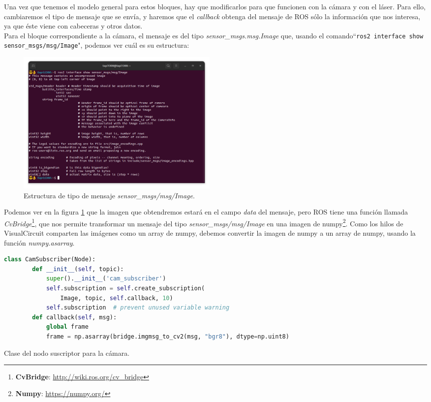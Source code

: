 Una vez que tenemos el modelo general para estos bloques, hay que modificarlos para que funcionen con la cámara y con el láser. Para ello,
cambiaremos el tipo de mensaje que se envía, y haremos que el \textit{callback} obtenga del mensaje de ROS sólo la información que nos interesa,
ya que éste viene con cabeceras y otros datos.\\

Para el bloque correspondiente a la cámara, el mensaje es del tipo \textit{sensor\_msgs.msg.Image} que, usando el comando``\lstinline|ros2 interface show sensor_msgs/msg/Image|",
podemos ver cuál es su estructura:
\begin{figure} [H]
  \begin{center}
      \includegraphics[width=10cm]{figs/c4/image_struct.png}
  \end{center}
  \caption[Estructura mensaje Image]{Estructura de tipo de mensaje \textit{sensor\_msgs/msg/Image}.}
  \label{fig:image_struct}
\end{figure}
Podemos ver en la figura \ref{fig:image_struct} que la imagen que obtendremos estará en el campo \textit{data} del mensaje, pero ROS tiene una
función llamada \textit{CvBridge}\footnote{\textbf{CvBridge}: \url{http://wiki.ros.org/cv_bridge}}, que nos permite transformar un mensaje del
tipo \textit{sensor\_msgs/msg/Image} en una imagen de numpy\footnote{\textbf{Numpy}: \url{https://numpy.org/}}. Como los hilos de VisualCircuit
comparten las imágenes como un array de numpy, debemos convertir la imagen de numpy a un array de numpy, usando la función \textit{numpy.asarray}.
\begin{code}[H]
  \begin{lstlisting}[language=python]
    class CamSubscriber(Node):
        def __init__(self, topic):
            super().__init__('cam_subscriber')
            self.subscription = self.create_subscription(
                Image, topic, self.callback, 10)
            self.subscription  # prevent unused variable warning
        def callback(self, msg):
            global frame
            frame = np.asarray(bridge.imgmsg_to_cv2(msg, "bgr8"), dtype=np.uint8)
  \end{lstlisting}
  \caption[Clase del nodo suscriptor para cámara]{Clase del nodo suscriptor para la cámara.}
  \label{cod:cam_node_class}
\end{code}
